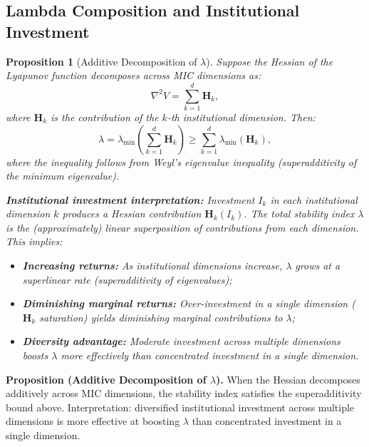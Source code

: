 \documentclass[12pt,a4paper]{article}
\newtheorem{proposition}[theorem]{Proposition}
\theoremstyle{definition}
\newcommand{\paren}[1]{\left(#1\right)}
\newcommand{\lb}{\lambda}
\newcommand{\lambdamin}{\lambda_{\min}}
\newcommand{\Lyap}{V}
\begin{document}
\subsection{Lambda Composition and Institutional Investment}
\label{sec:lambda_composition}

\begin{proposition}[Additive Decomposition of $\lb$]
\label{prop:lambda_decomp}
Suppose the Hessian of the Lyapunov function decomposes across MIC dimensions as:
\begin{equation}\label{eq:hessian_decomp}
    \nabla^2 \Lyap = \sum_{k=1}^{d} \mathbf{H}_k,
\end{equation}
where $\mathbf{H}_k$ is the contribution of the $k$-th institutional dimension. Then:
\begin{equation}\label{eq:lambda_additive}
    \lb = \lambdamin\paren{\sum_{k=1}^{d} \mathbf{H}_k} \geq \sum_{k=1}^{d} \lambdamin(\mathbf{H}_k),
\end{equation}
where the inequality follows from Weyl's eigenvalue inequality (superadditivity of the minimum eigenvalue).

\textbf{Institutional investment interpretation:} Investment $I_k$ in each institutional dimension $k$ produces a Hessian contribution $\mathbf{H}_k(I_k)$. The total stability index $\lb$ is the (approximately) linear superposition of contributions from each dimension. This implies:
\begin{itemize}
    \item \textbf{Increasing returns:} As institutional dimensions increase, $\lb$ grows at a superlinear rate (superadditivity of eigenvalues);
    \item \textbf{Diminishing marginal returns:} Over-investment in a single dimension ($\mathbf{H}_k$ saturation) yields diminishing marginal contributions to $\lb$;
    \item \textbf{Diversity advantage:} Moderate investment across multiple dimensions boosts $\lb$ more effectively than concentrated investment in a single dimension.
\end{itemize}
\end{proposition}

\noindent
\textbf{Proposition (Additive Decomposition of $\lb$).}
When the Hessian decomposes additively across MIC dimensions, the stability index satisfies the superadditivity bound above. Interpretation: diversified institutional investment across multiple dimensions is more effective at boosting $\lb$ than concentrated investment in a single dimension.
\end{document}
